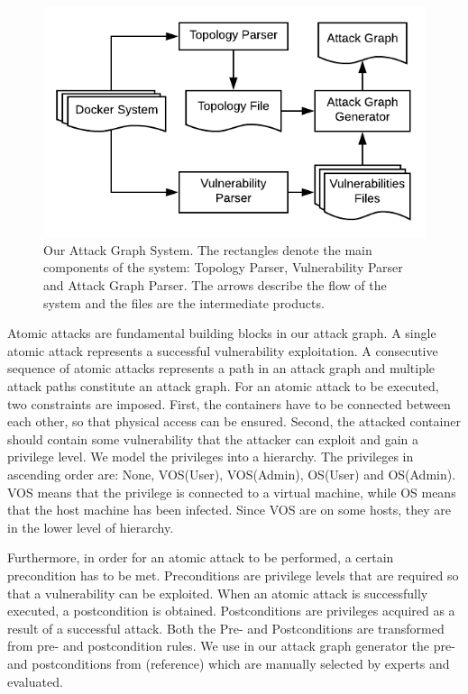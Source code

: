\documentclass[letterpaper, 10 pt, conference]{ieeeconf}  %
\begin{document}
\begin{figure}
	\includegraphics[width=\textwidth]{AttackGraphSystem}
	\caption{Our Attack Graph System. The rectangles denote the main components of the system: Topology Parser, Vulnerability Parser and Attack Graph Parser. The arrows describe the flow of the system and the files are the intermediate products.}
	\label{AttackGraphSystem}
\end{figure}


Atomic attacks are fundamental building blocks in our attack graph. A single atomic attack represents a successful vulnerability exploitation. A consecutive sequence of atomic attacks represents a path in an attack graph and multiple attack paths constitute an attack graph. For an atomic attack to be executed, two constraints are imposed. First, the containers have to be connected between each other, so that physical access can be ensured. Second, the attacked container should contain some vulnerability that the attacker can exploit and gain a privilege level. We model the privileges into a hierarchy. The privileges in ascending order are: None, VOS(User), VOS(Admin), OS(User) and OS(Admin). VOS means that the privilege is connected to a virtual machine, while OS means that the host machine has been infected. Since VOS are on some hosts, they are in the lower level of hierarchy.

Furthermore, in order for an atomic attack to be performed, a certain precondition has to be met. Preconditions are privilege levels that are required so that a vulnerability can be exploited. When an atomic attack is successfully executed, a postcondition is obtained. Postconditions are privileges acquired as a result of a successful attack. Both the Pre- and Postconditions are transformed from pre- and postcondition rules. We use in our attack graph generator the pre- and postconditions from (reference) which are manually selected by experts and evaluated.
\end{document}
